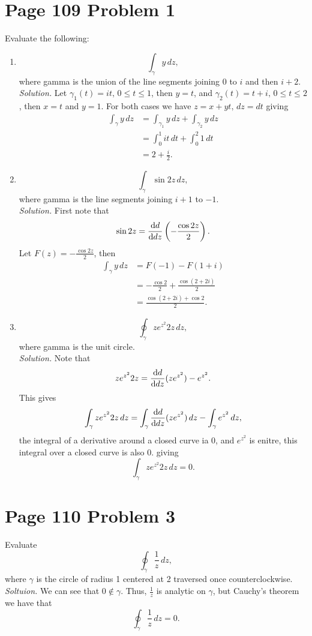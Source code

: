 \documentclass[12pt]{article}
\begin{document}
\section*{Page 109 Problem 1} Evaluate the following:
\begin{enumerate}[label=(\alph*)]
    \item
    \[
        \int_{\gamma}y\,dz,
    \]
    where gamma is the union of the line segments joining $0$ to $i$ and then $i+2$.\\
    \textit{Solution.} Let $\gamma_1(t)=it,\,0\leq t\leq1$, then $y=t$, and $\gamma_2(t)=t+i,\,0\leq t\leq 2$, then $x=t$ and $y=1$. For both cases we have $z=x+yt,\,dz=dt$ giving
    \begin{align*}
        \int_{\gamma}y\,dz&=\int_{\gamma_1}y\,dz+\int_{\gamma_2}y\,dz\\
        &=\int_{0}^{1}it\,dt+\int_{0}^{2}1\,dt\\
        &=2+\frac{i}{2}.
    \end{align*}
    \item 
    \[
        \int_{\gamma}\sin 2z\,dz,
    \]
    where gamma is the line segments joining $i+1$ to $-1$.\\
    \textit{Solution.} First note that
    \[
        \sin 2z=\frac{\mathrm{d}d}{\mathrm{d}dz}\left(-\frac{\cos 2z}{2}\right).
    \]
    Let $F(z)=-\frac{\cos 2z}{2}$, then
    \begin{align*}
        \int_{\gamma}y\,dz&=F(-1)-F(1+i)\\
        &=-\frac{\cos2}{2}+\frac{\cos(2+2i)}{2}\\
        &=\frac{\cos(2+2i)+\cos2}{2}.
    \end{align*}
    \item 
    \[
        \oint_{\gamma}ze^{z^2} 2z\,dz,
    \]
    where gamma is the unit circle.\\
    \textit{Solution.} Note that
    \[
        ze^{z^2} 2z=\frac{\mathrm{d}d}{\mathrm{d}dz}(ze^{z^2})-e^{z^2}.
    \]
    This gives
    \[
        \int_{\gamma}ze^{z^2} 2z\,dz=\int_{\gamma}\frac{\mathrm{d}d}{\mathrm{d}dz}(ze^{z^2})\,dz-\int_{\gamma}e^{z^2}\,dz,
    \]
    the integral of a derivative around a closed curve ia 0, and $e^{z^2}$ is enitre, this integral over a closed curve is also 0. giving
    \[
        \int_{\gamma}ze^{z^2} 2z\,dz=0.
    \]
\end{enumerate}



\section*{Page 110 Problem 3} Evaluate 
\[
    \oint_{\gamma}\frac{1}{z}\,dz,
\]
where $\gamma$ is the circle of radius 1 centered at 2 traversed once counterclockwise.\\
\textit{Soltuion.} We can see that $0\not\in\gamma$. Thus, $\frac{1}{z}$ is analytic on $\gamma$, but Cauchy's theorem we have that
\[
    \oint_{\gamma}\frac{1}{z}\,dz=0.
\]
\end{document}
